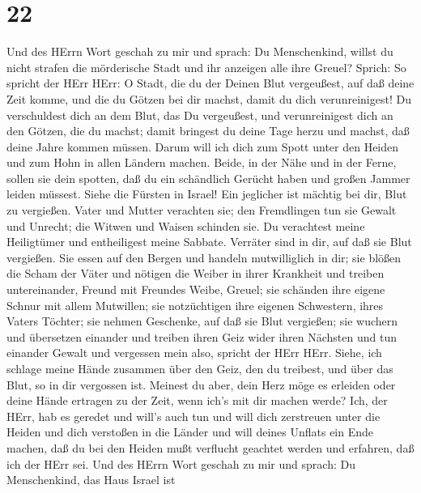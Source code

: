 \hypertarget{section-21}{%
\section{22}\label{section-21}}

 Und des HErrn Wort geschah zu mir und sprach: 
Du Menschenkind, willst du nicht strafen die mörderische Stadt und ihr
anzeigen alle ihre Greuel?  Sprich: So spricht der HErr
HErr: O Stadt, die du der Deinen Blut vergeußest, auf daß deine Zeit
komme, und die du Götzen bei dir machst, damit du dich verunreinigest!
 Du verschuldest dich an dem Blut, das Du vergeußest, und
verunreinigest dich an den Götzen, die du machst; damit bringest du
deine Tage herzu und machst, daß deine Jahre kommen müssen. Darum will
ich dich zum Spott unter den Heiden und zum Hohn in allen Ländern
machen.  Beide, in der Nähe und in der Ferne, sollen sie
dein spotten, daß du ein schändlich Gerücht haben und großen Jammer
leiden müssest.  Siehe die Fürsten in Israel! Ein jeglicher
ist mächtig bei dir, Blut zu vergießen.  Vater und Mutter
verachten sie; den Fremdlingen tun sie Gewalt und Unrecht; die Witwen
und Waisen schinden sie.  Du verachtest meine Heiligtümer
und entheiligest meine Sabbate.  Verräter sind in dir, auf
daß sie Blut vergießen. Sie essen auf den Bergen und handeln
mutwilliglich in dir;  sie blößen die Scham der Väter und
nötigen die Weiber in ihrer Krankheit  und treiben
untereinander, Freund mit Freundes Weibe, Greuel; sie schänden ihre
eigene Schnur mit allem Mutwillen; sie notzüchtigen ihre eigenen
Schwestern, ihres Vaters Töchter;  sie nehmen Geschenke,
auf daß sie Blut vergießen; sie wuchern und übersetzen einander und
treiben ihren Geiz wider ihren Nächsten und tun einander Gewalt und
vergessen mein also, spricht der HErr HErr.  Siehe, ich
schlage meine Hände zusammen über den Geiz, den du treibest, und über
das Blut, so in dir vergossen ist.  Meinest du aber, dein
Herz möge es erleiden oder deine Hände ertragen zu der Zeit, wenn ich's
mit dir machen werde? Ich, der HErr, hab es geredet und will's auch tun
 und will dich zerstreuen unter die Heiden und dich
verstoßen in die Länder und will deines Unflats ein Ende machen,
 daß du bei den Heiden mußt verflucht geachtet werden und
erfahren, daß ich der HErr sei.  Und des HErrn Wort geschah
zu mir und sprach:  Du Menschenkind, das Haus Israel ist
